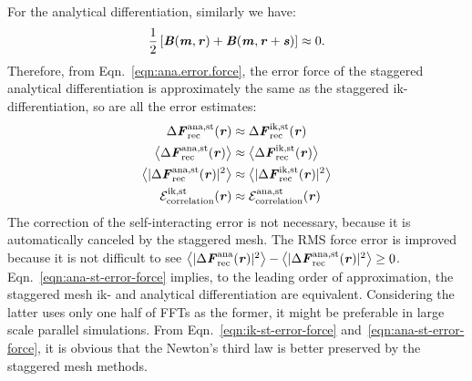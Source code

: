 \documentclass[aps,pre,preprint,unsortedaddress]{revtex4}
\renewcommand{\v}[1]{\textbf{\textit{#1}}}
\begin{document}
For the analytical differentiation, similarly we have:
\begin{align}\label{eqn:leading-order-2}
\frac12\,[\v
B(\v m,\v r) + \v B(\v m, \v r+\v s)] \approx 0.  
\end{align}
Therefore, from
Eqn.~\eqref{eqn:ana.error.force}, the error force of the staggered
analytical differentiation is approximately the same as the staggered
ik-differentiation, so are all the error estimates:
\begin{align}\label{eqn:ana-st-error-force}
  \Delta\v F^{\textrm{ana,st}}_{\textrm{rec}}(\v r)
  &\approx
  \Delta\v F^{\textrm{ik,st}}_{\textrm{rec}}(\v r)\\
  \big\langle
  \Delta\v F_{\textrm{rec}}^{\textrm{ana,st}}(\v r)
  \big\rangle
  &\approx
  \big\langle
  \Delta\v F_{\textrm{rec}}^{\textrm{ik,st}}(\v r)
  \big\rangle\\
  \big\langle
  \vert\Delta\v F_{\textrm{rec}}^{\textrm{ana,st}}(\v r)\vert^2
  \big\rangle
  &\approx
  \big\langle
  \vert\Delta\v F_{\textrm{rec}}^{\textrm{ik,st}}(\v r)\vert^2
  \big\rangle\\
  \mathcal E^{\textrm{ik,st}}_{\textrm{correlation}}(\v r)
  &\approx
  \mathcal E^{\textrm{ana,st}}_{\textrm{correlation}}(\v r)
\end{align}
The correction of the self-interacting error is not necessary,
because it is automatically canceled by the staggered mesh.
The RMS force error is improved because it is not
difficult to see 
$\big\langle\vert\Delta\v F_{\textrm{rec}}^{\textrm{ana}}(\v r)\vert^2\big\rangle -
\big\langle\vert\Delta\v F_{\textrm{rec}}^{\textrm{ana,st}}(\v r)\vert^2\big\rangle
\geq 0$.
Eqn.~\eqref{eqn:ana-st-error-force} implies, to the
leading order of approximation, the staggered
mesh ik- and analytical differentiation
are equivalent. Considering the latter uses
only one half of  FFTs as the former, it might be preferable
in large scale parallel simulations.
From Eqn.~\eqref{eqn:ik-st-error-force}
and~\eqref{eqn:ana-st-error-force}, it is obvious that the Newton's
third law is better preserved by the staggered mesh methods.



\end{document}
